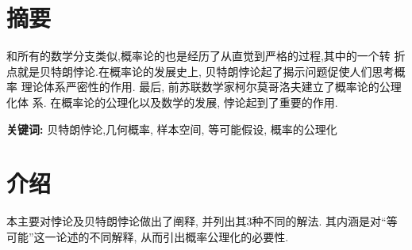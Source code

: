 \section*{ \centering 摘要}

\vskip0.5cm
和所有的数学分支类似,概率论的也是经历了从直觉到严格的过程,其中的一个转
折点就是贝特朗悖论.在概率论的发展史上, 贝特朗悖论起了揭示问题促使人们思考概率
理论体系严密性的作用. 最后, 前苏联数学家柯尔莫哥洛夫建立了概率论的公理化体
系. 在概率论的公理化以及数学的发展, 悖论起到了重要的作用.


\textbf{关键词:}  贝特朗悖论,几何概率, 样本空间, 等可能假设, 概率的公理化

\section*{ \centering 介绍}

本主要对悖论及贝特朗悖论做出了阐释, 并列出其3种不同的解法. 其内涵是对“等可能”这一论述的不同解释, 从而引出概率公理化的必要性.

